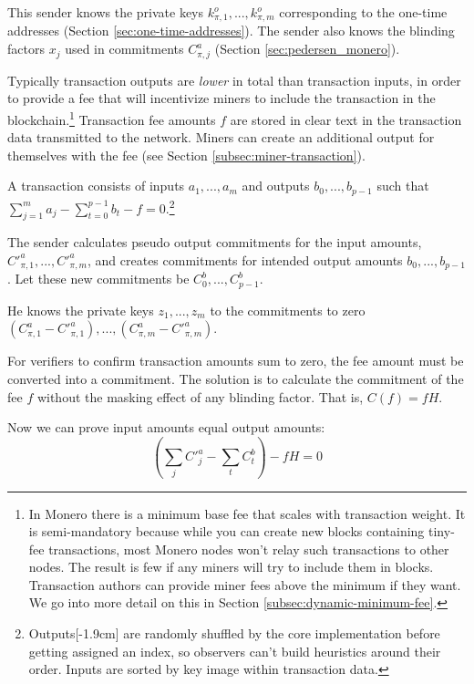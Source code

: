 This sender knows the private keys $k^o_{\pi,1}, ..., k^o_{\pi,m}$ corresponding to the one-time addresses (Section \ref{sec:one-time-addresses}). The sender also knows the blinding factors $x_j$ used in commitments $C^a_{\pi,j}$ (Section \ref{sec:pedersen_monero}).

Typically transaction outputs are {\em lower} in total than transaction inputs, in order to provide a fee that will incentivize miners to include the transaction in the blockchain.\footnote{In Monero there is a minimum base fee that scales with transaction weight. It is semi-mandatory because while you can create new blocks containing tiny-fee transactions, most Monero nodes won't relay such transactions to other nodes. The result is few if any miners will try to include them in blocks. Transaction authors can provide miner fees above the minimum if they want. We go into more detail on this in Section \ref{subsec:dynamic-minimum-fee}.} Transaction fee amounts $f$ are stored in clear text in the transaction data transmitted to the network. Miners can create an additional output for themselves with the fee (see Section \ref{subsec:miner-transaction}).

A transaction consists of inputs \(a_1, ..., a_m\) and outputs \(b_0, ..., b_{p-1}\) such that \(\sum\limits_{j=1}^m a_j - \sum\limits_{t=0}^{p-1} b_t - f = 0\).\footnote{Outputs[-1.9cm] are randomly shuffled by the core implementation before getting assigned an index, so observers can't build heuristics around their order. Inputs are sorted by key image within transaction data.}

The sender calculates pseudo output commitments for the input amounts, $C'^a_{\pi,1}, ..., C'^a_{\pi,m}$, and creates commitments for intended output amounts $b_0, ..., b_{p-1}$. Let these new commitments be $C^b_0, ..., C^b_{p-1}$.

He knows the private keys $z_1,...,z_m$ to the commitments to zero $(C^a_{\pi,1} - C'^a_{\pi,1}),...,(C^a_{\pi,m} - C'^a_{\pi,m})$.

For verifiers to confirm transaction amounts sum to zero, the fee amount must be converted into a commitment. The solution is to calculate the commitment of the fee $f$ without the masking effect of any blinding factor. That is, $C(f) = f H$.

Now we can prove input amounts equal output amounts:\\
\[(\sum_j C'^a_{j} - \sum_t C^b_{t}) - f H = 0\]


